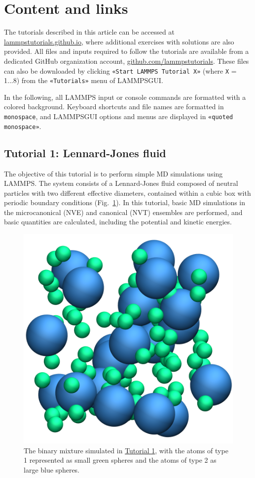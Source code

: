 \documentclass[9pt,tutorial]{livecoms}
\newcommand{\lmpcmd}[1]{\colorbox{listing}{\textcolor{command}{\small{#1}}}} %
\newcommand{\flecmd}[1]{\textcolor{command}{\texttt{#1}}} %
\newcommand{\guicmd}[1]{\textcolor{command}{\texttt{«#1»}}} %
\newcommand{\lammpsgui}{\textsf{LAMMPS\textendash GUI}}
\begin{document}
\section{Content and links}

The tutorials described in this article can be accessed at
\href{https://lammpstutorials.github.io}{lammpstutorials.github.io},
where additional exercises with solutions are also provided.  All files
and inputs required to follow the tutorials are available from a
dedicated GitHub organization account,
\href{https://github.com/lammpstutorials}{github.com/lammpstutorials}.
These files can also be downloaded by clicking \guicmd{Start LAMMPS Tutorial X}
(where \texttt{X} = 1...8) from the \guicmd{Tutorials} menu of \lammpsgui{}.

In the following, all LAMMPS input or console commands are formatted
with a \lmpcmd{colored background}.  Keyboard shortcuts and
file names are formatted in \flecmd{monospace}, and \lammpsgui{} options and menus
are displayed in \guicmd{quoted monospace}.

\subsection{Tutorial 1: Lennard-Jones fluid}
\label{lennard-jones-label}

The objective of this tutorial is to perform simple MD simulations
using LAMMPS.  The system consists of a Lennard-Jones fluid composed of
neutral particles with two different effective diameters, contained
within a cubic box with periodic boundary conditions
(Fig.~\ref{fig:LJ-avatar}).  In this tutorial, basic MD simulations in
the microcanonical (NVE) and canonical (NVT) ensembles are performed,
and basic quantities are calculated, including the potential and kinetic
energies.

\begin{figure}
\centering
\includegraphics[width=0.65\linewidth]{LJ-avatar}
\caption{The binary mixture simulated in
  \hyperref[lennard-jones-label]{Tutorial 1}, with the atoms of type 1
  represented as small green spheres and the atoms of type 2 as large
  blue spheres.}
\label{fig:LJ-avatar}
\end{figure}
\end{document}
